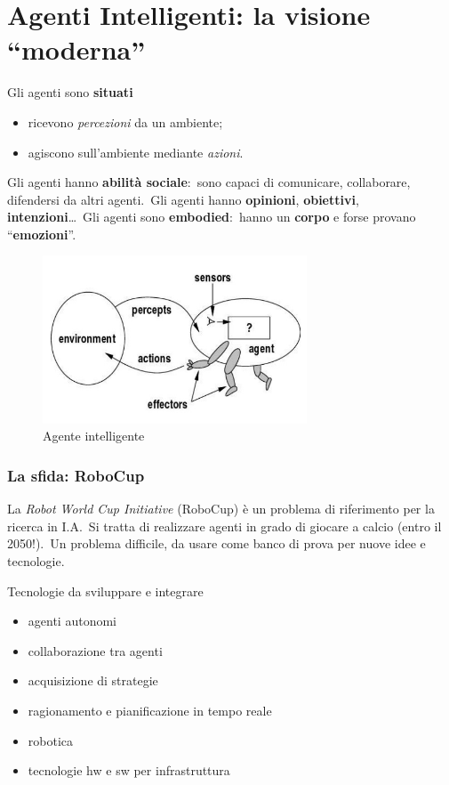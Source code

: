 \section{Agenti Intelligenti: la visione ``moderna''}
Gli agenti sono \textbf{situati}
\begin{itemize}
	\item  ricevono \textit{percezioni} da un ambiente;
	\item  agiscono sull'ambiente mediante \textit{azioni}.
\end{itemize}
Gli agenti hanno \textbf{abilità sociale}:\ sono capaci di comunicare, collaborare, difendersi da altri agenti.\
Gli agenti hanno \textbf{opinioni}, \textbf{obiettivi}, \textbf{intenzioni}\dots\
Gli agenti sono \textbf{embodied}:\ hanno un \textbf{corpo} e forse provano ``\textbf{emozioni}''.
\begin{figure}[H]
	\centering
	\includegraphics[width=0.7\textwidth]{immagini/Agenti_intelligenti.jpg}
	\caption*{Agente intelligente}
\end{figure}

\subsubsection{La sfida: RoboCup}
La \textit{Robot World Cup Initiative} (RoboCup) è un problema di riferimento per la ricerca in I.A.\
Si tratta di realizzare agenti in grado di giocare a calcio (entro il 2050!).\
Un problema difficile, da usare come banco di prova per nuove idee e tecnologie.

Tecnologie da sviluppare e integrare

\begin{itemize}
	\item agenti autonomi
	\item collaborazione tra agenti
	\item acquisizione di strategie
	\item ragionamento e pianificazione in tempo reale
	\item robotica
	\item tecnologie hw e sw per infrastruttura
\end{itemize}


